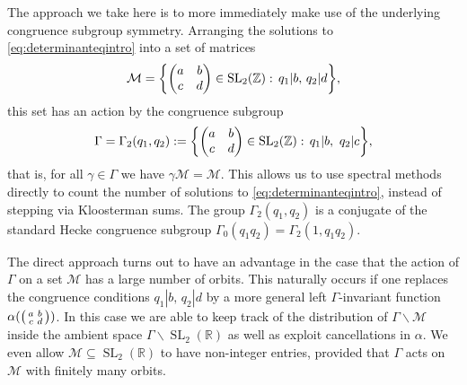 \documentclass[12pt]{amsart}
\theoremstyle{definition}
\theoremstyle{remark}
\numberwithin{equation}{section}
\newcommand{\R}{{\mathbb R}}
\newcommand{\Z}{{\mathbb Z}}
\newcommand{\1}{{\mathbf 1}}
\newcommand{\SL}{\operatorname{SL}_2}
\renewcommand{\c}{\mathfrak c}
\begin{document}
The approach we take here is to more immediately make use of the underlying congruence subgroup symmetry. Arranging the solutions to \eqref{eq:determinanteqintro} into a set of matrices
\begin{align*}
  \mathcal{M} = \bigg \{ \mqty( a & b  \\c & d )\in \SL(\Z): \, q_1 | b, \, q_2 | d  \bigg \},
\end{align*}
this set has an action by the congruence subgroup
\begin{align}
   \Gamma =  \Gamma_2(q_1,q_2) := \bigg\{\mqty(a & b \\c & d) \in \SL(\Z): \, q_1 |b, \, \, q_2 |c  \bigg\},
\end{align}
that is, for all $\gamma \in \Gamma$ we have $\gamma \mathcal{M} = \mathcal{M}$. This allows us to use spectral methods directly to count the number of solutions to \eqref{eq:determinanteqintro}, instead of stepping via Kloosterman sums. The group $\Gamma_2(q_1,q_2)$ is a conjugate of the standard Hecke congruence subgroup $\Gamma_0(q_1q_2) = \Gamma_2(1,q_1q_2)$.

The direct approach turns out to have an advantage in the case that the action of $\Gamma$ on a set $\mathcal{M}$ has a large number of orbits. This naturally occurs if one replaces the congruence conditions $q_1 | b, \, q_2 | d$ by a more general left $\Gamma$-invariant function $\alpha(\smqty(a &b \\ c& d))$. In this case we are able to keep track of the distribution of $\Gamma \backslash \mathcal{M}$ inside the ambient space $\Gamma \backslash \SL(\R)$ as well as exploit cancellations in $\alpha$. We even allow $\mathcal{M} \subseteq \SL(\R)$ to have non-integer entries, provided that $\Gamma$ acts on $\mathcal{M}$ with finitely many orbits. 
\end{document}

